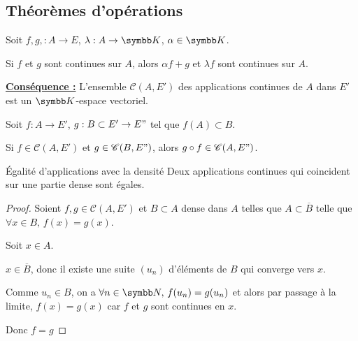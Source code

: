 \subsection{Théorèmes d'opérations}

\begin{theoreme}{}{}
    Soit $f, g, : A \to E$, $\lambda : A \to \K$, $\alpha \in \K$.

    Si $f$ et $g$ sont continues sur $A$, alors $\alpha f + g$ et $\lambda f$ sont 
    continues sur $A$. 
\end{theoreme}

\textbf{\uline{Conséquence :}}
L'ensemble $\mathscr C(A, E')$ des applications continues de $A$ dans $E'$ est un $\K$-espace vectoriel.

\begin{theorement}{}{}
    Soit $f : A \to E'$, $g : B \subset E' \to E"$ tel que $f(A) \subset B$.

    Si $f \in \mathscr C(A, E')$ et $g \in \mathscr C(B, E")$, alors 
    $g \circ f \in \mathscr C(A, E")$.
\end{theorement}

\begin{theoreme}{Égalité d'applications avec la densité}{}
    Deux applications continues qui coincident sur une partie dense sont égales. 
\end{theoreme}


\begin{proof}
    Soient $f, g \in \mathscr C(A, E')$ et $B \subset A$ dense dans $A$ telles que
    $A \subset \overline B$ telle que $\forall x \in B, \, f(x) = g(x)$.

    Soit $x \in A$. 

    $x \in \overline B$, donc il existe une suite $(u_n)$ d'éléments de $B$ qui converge vers $x$.
    
    Comme $u_n \in B$, on a $\forall n \in \N, \, f(u_n) = g(u_n)$ et alors par 
    passage à la limite, $f(x) = g(x)$ car $f$ et $g$ sont continues en $x$.

    Donc $f = g$
\end{proof}

